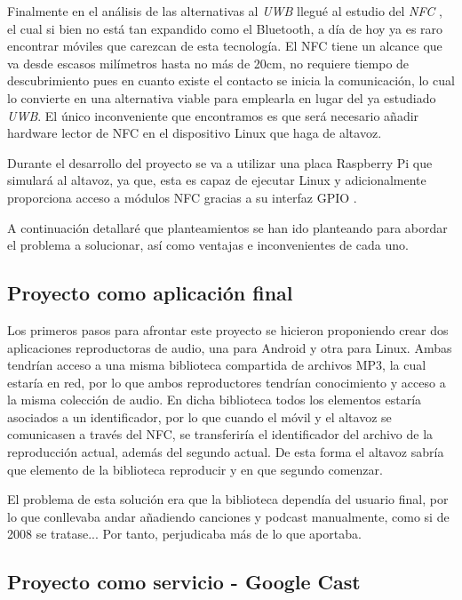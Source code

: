 Finalmente en el análisis de las alternativas al \emph{UWB} llegué al estudio
del \emph{NFC} \cite{NFC}, el cual si bien no está tan expandido como el
Bluetooth, a día de hoy ya es raro encontrar móviles que carezcan de esta
tecnología. El NFC tiene un alcance que va desde escasos milímetros hasta no más
de 20cm, no requiere tiempo de descubrimiento pues en cuanto existe el contacto
se inicia la comunicación, lo cual lo convierte en una alternativa viable para
emplearla en lugar del ya estudiado \emph{UWB}. El único inconveniente que
encontramos es que será necesario añadir hardware lector de NFC en el
dispositivo Linux que haga de altavoz.

Durante el desarrollo del proyecto se va a utilizar una placa Raspberry Pi que
simulará al altavoz, ya que, esta es capaz de ejecutar Linux y adicionalmente
proporciona acceso a módulos NFC gracias a su interfaz GPIO \cite{GPIO}.

A continuación detallaré que planteamientos se han ido planteando para abordar el
problema a solucionar, así como ventajas e inconvenientes de cada uno.

\subsection{Proyecto como aplicación final}

Los primeros pasos para afrontar este proyecto se hicieron proponiendo crear dos
aplicaciones reproductoras de audio, una para Android y otra para Linux. Ambas
tendrían acceso a una misma biblioteca compartida de archivos MP3, la cual
estaría en red, por lo que ambos reproductores tendrían conocimiento y acceso a
la misma colección de audio. En dicha biblioteca todos los elementos estaría
asociados a un identificador, por lo que cuando el móvil y el altavoz se
comunicasen a través del NFC, se transferiría el identificador del archivo de la
reproducción actual, además del segundo actual. De esta forma el altavoz sabría
que elemento de la biblioteca reproducir y en que segundo comenzar.

El problema de esta solución era que la biblioteca dependía del usuario final,
por lo que conllevaba andar añadiendo canciones y podcast manualmente, como si
de 2008 se tratase... Por tanto, perjudicaba más de lo que aportaba.

\subsection{Proyecto como servicio - Google Cast}

